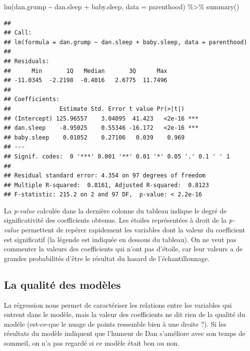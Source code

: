 \documentclass[
  french,
]{book}
\newenvironment{Shaded}{\begin{snugshade}}{\end{snugshade}}
\newcommand{\AttributeTok}[1]{\textcolor[rgb]{0.77,0.63,0.00}{#1}}
\newcommand{\FunctionTok}[1]{\textcolor[rgb]{0.00,0.00,0.00}{#1}}
\newcommand{\NormalTok}[1]{#1}
\newcommand{\SpecialCharTok}[1]{\textcolor[rgb]{0.00,0.00,0.00}{#1}}
\begin{document}
\begin{Shaded}
\begin{Highlighting}[]
\FunctionTok{lm}\NormalTok{(dan.grump }\SpecialCharTok{\textasciitilde{}}\NormalTok{ dan.sleep }\SpecialCharTok{+}\NormalTok{ baby.sleep, }\AttributeTok{data =}\NormalTok{ parenthood) }\SpecialCharTok{\%\textgreater{}\%} \FunctionTok{summary}\NormalTok{()}
\end{Highlighting}
\end{Shaded}

\begin{verbatim}
## 
## Call:
## lm(formula = dan.grump ~ dan.sleep + baby.sleep, data = parenthood)
## 
## Residuals:
##      Min       1Q   Median       3Q      Max 
## -11.0345  -2.2198  -0.4016   2.6775  11.7496 
## 
## Coefficients:
##              Estimate Std. Error t value Pr(>|t|)    
## (Intercept) 125.96557    3.04095  41.423   <2e-16 ***
## dan.sleep    -8.95025    0.55346 -16.172   <2e-16 ***
## baby.sleep    0.01052    0.27106   0.039    0.969    
## ---
## Signif. codes:  0 '***' 0.001 '**' 0.01 '*' 0.05 '.' 0.1 ' ' 1
## 
## Residual standard error: 4.354 on 97 degrees of freedom
## Multiple R-squared:  0.8161, Adjusted R-squared:  0.8123 
## F-statistic: 215.2 on 2 and 97 DF,  p-value: < 2.2e-16
\end{verbatim}

La \emph{p-value} calculée dans la dernière colonne du tableau indique le degré de significativité des coefficients obtenus. Les étoiles représentées à droit de la \emph{p-value} permettent de repérer rapidement les variables dont la valeur du coefficient est significatif (la légende est indiquée en dessous du tableau). On ne veut pas commenter la valeurs des coefficients qui n'ont pas d'étoile, car leur valeurs a de grandes probabilités d'être le résultat du hasard de l'échantillonnage.

\hypertarget{la-qualituxe9-des-moduxe8les}{%
\subsection{La qualité des modèles}\label{la-qualituxe9-des-moduxe8les}}

La régression nous permet de caractériser les relations entre les variables qui entrent dans le modèle, mais la valeur des coefficients ne dit rien de la qualité du modèle (est-ce-que le nuage de points ressemble bien à une droite ?). Si les résultats du modèle indiquent que l'humeur de Dan s'améliore avec son temps de sommeil, on n'a pas regardé si ce modèle était bon ou non.
\end{document}
